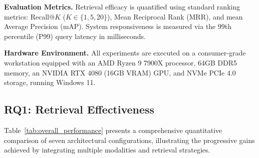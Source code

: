 \textbf{Evaluation Metrics.} Retrieval efficacy is quantified using standard ranking metrics: Recall@$K$ ($K \in \{1, 5, 20\}$), Mean Reciprocal Rank (MRR), and mean Average Precision (mAP). System responsiveness is measured via the 99th percentile (P99) query latency in milliseconds.

\textbf{Hardware Environment.} All experiments are executed on a consumer-grade workstation equipped with an AMD Ryzen 9 7900X processor, 64GB DDR5 memory, an NVIDIA RTX 4080 (16GB VRAM) GPU, and NVMe PCIe 4.0 storage, running Windows 11.

\subsection{RQ1: Retrieval Effectiveness}

Table~\ref{tab:overall_performance} presents a comprehensive quantitative comparison of seven architectural configurations, illustrating the progressive gains achieved by integrating multiple modalities and retrieval strategies.

\begin{table}[t]
\centering
\caption{Comparative evaluation of retrieval effectiveness and latency across different system configurations. The proposed \textsc{Vecna} (Full) system demonstrates superior accuracy across all metrics while maintaining sub-second latency.}
\label{tab:overall_performance}
\vspace{-2mm}
\end{table}

